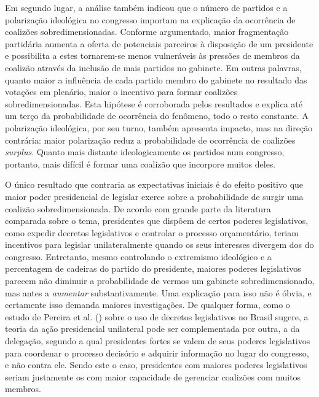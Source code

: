 Em segundo lugar, a análise também indicou que o número de partidos e a polarização ideológica no congresso importam na explicação da ocorrência de coalizões sobredimensionadas. Conforme argumentado, maior fragmentação partidária aumenta a oferta de potenciais parceiros à disposição de um presidente e possibilita a estes tornarem-se menos vulneráveis às pressões de membros da coalizão através da inclusão de mais partidos no gabinete. Em outras palavras, quanto maior a influência de cada partido membro do gabinete no resultado das votações em plenário, maior o incentivo para formar coalizões sobredimensionadas. Esta hipótese é corroborada pelos resultados e explica até um terço da probabilidade de ocorrência do fenômeno, todo o resto constante. A polarização ideológica, por seu turno, também apresenta impacto, mas na direção contrária: maior polarização reduz a probabilidade de ocorrência de coalizões \textit{surplus}. Quanto mais distante ideologicamente os partidos num congresso, portanto, mais difícil é formar uma coalizão que incorpore muitos deles.

O único resultado que contraria as expectativas iniciais é do efeito positivo que maior poder presidencial de legislar exerce sobre a probabilidade de surgir uma coalizão sobredimensionada. De acordo com grande parte da literatura comparada sobre o tema, presidentes que dispõem de certos poderes legislativos, como expedir decretos legislativos e controlar o processo orçamentário, teriam incentivos para legislar unilateralmente quando os seus interesses divergem dos do congresso. Entretanto, mesmo controlando o extremismo ideológico e a percentagem de cadeiras do partido do presidente, maiores poderes legislativos parecem não diminuir a probabilidade de vermos um gabinete sobredimensionado, mas antes a \textit{aumentar} substantivamente. Uma explicação para isso não é óbvia, e certamente isso demanda maiores investigações. De qualquer forma, como o estudo de Pereira et al. (\citeyear{pereira2005}) sobre o uso de decretos legislativos no Brasil sugere, a teoria da ação presidencial unilateral pode ser complementada por outra, a da delegação, segundo a qual presidentes fortes se valem de seus poderes legislativos para coordenar o processo decisório e adquirir informação no lugar do congresso, e não contra ele. Sendo este o caso, presidentes com maiores poderes legislativos seriam justamente os com maior capacidade de gerenciar coalizões com muitos membros.

